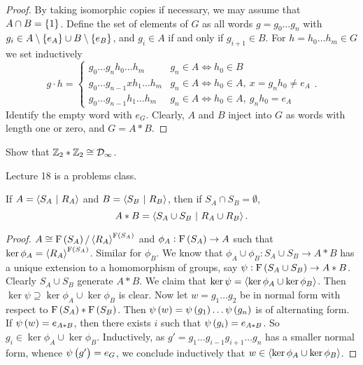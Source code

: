\begin{proof}
By taking isomorphic copies if necessary, we may assume that $ A \cap B = \cbr{1} $. Define the set of elements of $ G $ as all words $ g = g_0 \dots g_n $ with $ g_i \in A \setminus \cbr{e_A} \cup B \setminus \cbr{e_B} $, and $ g_i \in A $ if and only if $ g_{i + 1} \in B $. For $ h = h_0 \dots h_m \in G $ we set inductively
$$ g \cdot h =
\begin{cases}
g_0 \dots g_nh_0 \dots h_m & g_n \in A \iff h_0 \in B \\
g_0 \dots g_{n - 1}xh_1 \dots h_m & g_n \in A \iff h_0 \in A, \ x = g_nh_0 \ne e_A \\
g_0 \dots g_{n - 1}h_1 \dots h_m & g_n \in A \iff h_0 \in A, \ g_nh_0 = e_A
\end{cases}.
$$
Identify the empty word with $ e_G $. Clearly, $ A $ and $ B $ inject into $ G $ as words with length one or zero, and $ G = A * B $.
\end{proof}

\begin{exercise}
Show that $ \mathbb{Z}_2 * \mathbb{Z}_2 \cong \mathcal{D}_\infty $.
\end{exercise}


Lecture 18 is a problems class.

\pagebreak


\begin{proposition}
If $ A = \left\langle S_A \ \middle| \  R_A \right\rangle $ and $ B = \left\langle S_B \ \middle| \  R_B \right\rangle $, then if $ S_A \cap S_B = \emptyset $,
$$ A * B = \left\langle S_A \cup S_B \ \middle| \  R_A \cup R_B \right\rangle. $$
\end{proposition}

\begin{proof}
$ A \cong \F\br{S_A} / \abr{R_A}^{\F\br{S_A}} $ and $ \phi_A : \F\br{S_A} \to A $ such that $ \ker \phi_A = \abr{R_A}^{\F\br{S_A}} $. Similar for $ \phi_B $. We know that $ \phi_A \cup \phi_B : S_A \cup S_B \to A * B $ has a unique extension to a homomorphism of groups, say $ \psi : \F\br{S_A \cup S_B} \to A * B $. Clearly $ S_A \cup S_B $ generate $ A * B $. We claim that $ \ker \psi = \left\langle \ker \phi_A \cup \ker \phi_B \right\rangle $. Then $ \ker \psi \supseteq \ker \phi_A \cup \ker \phi_B $ is clear. Now let $ w = g_1 \dots g_2 $ be in normal form with respect to $ \F\br{S_A} * \F\br{S_B} $. Then $ \psi\br{w} = \psi\br{g_1} \dots \psi\br{g_n} $ is of alternating form. If $ \psi\br{w} = e_{A * B} $, then there exists $ i $ such that $ \psi\br{g_i} = e_{A * B} $. So $ g_i \in \ker \phi_A \cup \ker \phi_B $. Inductively, as $ g' = g_1 \dots g_{i - 1}g_{i + 1} \dots g_n $ has a smaller normal form, whence $ \psi\br{g'} = e_G $, we conclude inductively that $ w \in \left\langle \ker \phi_A \cup \ker \phi_B \right\rangle $.
\end{proof}

